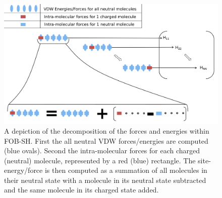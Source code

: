 \begin{figure}[ht]
  \includegraphics[width=\textwidth]{./img/ES/ForceEnerDecomp.png}
  \caption{\label{fig:enerF_decomp}A depiction of the decomposition of the forces and energies within FOB-SH. First the all neutral VDW forces/energies are computed (blue ovals). Second the intra-molecular forces for each charged (neutral) molecule, represented by a red (blue) rectangle. The site-energy/force is then computed as a summation of all molecules in their neutral state with a molecule in its neutral state subtracted and the same molecule in its charged state added.} 
\end{figure}
\\
